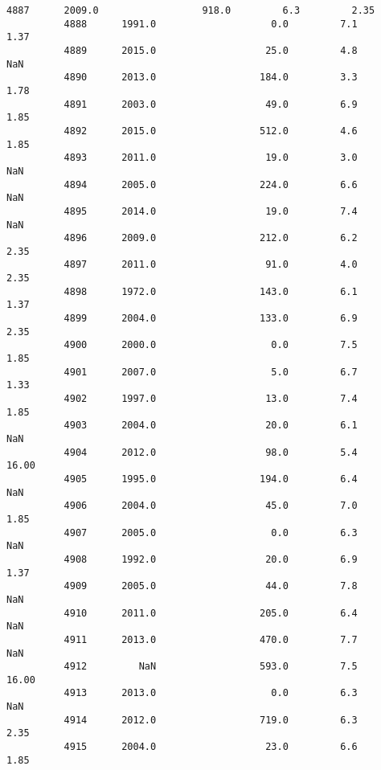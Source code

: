\documentclass[11pt]{article}
\begin{document}
\begin{Verbatim}[commandchars=\\\{\}]
          4887      2009.0                  918.0         6.3         2.35   
          4888      1991.0                    0.0         7.1         1.37   
          4889      2015.0                   25.0         4.8          NaN   
          4890      2013.0                  184.0         3.3         1.78   
          4891      2003.0                   49.0         6.9         1.85   
          4892      2015.0                  512.0         4.6         1.85   
          4893      2011.0                   19.0         3.0          NaN   
          4894      2005.0                  224.0         6.6          NaN   
          4895      2014.0                   19.0         7.4          NaN   
          4896      2009.0                  212.0         6.2         2.35   
          4897      2011.0                   91.0         4.0         2.35   
          4898      1972.0                  143.0         6.1         1.37   
          4899      2004.0                  133.0         6.9         2.35   
          4900      2000.0                    0.0         7.5         1.85   
          4901      2007.0                    5.0         6.7         1.33   
          4902      1997.0                   13.0         7.4         1.85   
          4903      2004.0                   20.0         6.1          NaN   
          4904      2012.0                   98.0         5.4        16.00   
          4905      1995.0                  194.0         6.4          NaN   
          4906      2004.0                   45.0         7.0         1.85   
          4907      2005.0                    0.0         6.3          NaN   
          4908      1992.0                   20.0         6.9         1.37   
          4909      2005.0                   44.0         7.8          NaN   
          4910      2011.0                  205.0         6.4          NaN   
          4911      2013.0                  470.0         7.7          NaN   
          4912         NaN                  593.0         7.5        16.00   
          4913      2013.0                    0.0         6.3          NaN   
          4914      2012.0                  719.0         6.3         2.35   
          4915      2004.0                   23.0         6.6         1.85   
          

\end{Verbatim}
\end{document}
